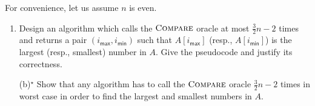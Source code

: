 \documentclass[letterpaper, 11pt]{article}
\newcommand{\1}{\mathds{1}}	%
\theoremstyle{definition}
\begin{document}
For convenience, let us assume $n$ is even.
\begin{enumerate}
    \item Design an algorithm which calls the $\textsc{Compare}$ oracle at most $\frac{3}{2} n - 2$ times and returns a pair $(i_\mathsf{max},i_\mathsf{min})$ such that $A[i_\mathsf{max}]$ (resp., $A[i_\mathsf{min}]$) is the largest (resp., smallest) number in $A$. Give the pseudocode and justify its correctness.
    
    \item[(b)$^\star$] Show that any algorithm has to call the $\textsc{Compare}$ oracle $\frac{3}{2} n - 2$ times in worst case in order to find the largest and smallest numbers in $A$.

\end{enumerate}
\end{document}
